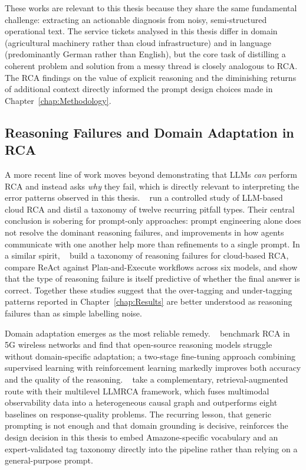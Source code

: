 These works are relevant to this thesis because they share the same fundamental
challenge: extracting an actionable diagnosis from noisy, semi-structured
operational text.  The service tickets analysed in this thesis differ in domain
(agricultural machinery rather than cloud infrastructure) and in language
(predominantly German rather than English), but the core task of distilling a
coherent problem and solution from a messy thread is closely analogous to RCA.
The RCA findings on the value of explicit reasoning and the diminishing returns
of additional context directly informed the prompt design choices made in
Chapter~\ref{chap:Methodology}.

\subsection{Reasoning Failures and Domain Adaptation in RCA}
\label{subsec:rw-rca-failures}
%
A more recent line of work moves beyond demonstrating that LLMs \emph{can}
perform RCA and instead asks \emph{why} they fail, which is directly relevant
to interpreting the error patterns observed in this thesis.
\citeauthor{kim2026why}~\cite{kim2026why} run a controlled study of LLM-based
cloud RCA and distil a taxonomy of twelve recurring pitfall types.  Their
central conclusion is sobering for prompt-only approaches: prompt engineering
alone does not resolve the dominant reasoning failures, and improvements in how
agents communicate with one another help more than refinements to a single
prompt.  In a similar spirit, \citeauthor{riddell2026stalled}~%
\cite{riddell2026stalled} build a taxonomy of reasoning failures for
cloud-based RCA, compare ReAct against Plan-and-Execute workflows across six
models, and show that the type of reasoning failure is itself predictive of
whether the final answer is correct.  Together these studies suggest that the
over-tagging and under-tagging patterns reported in Chapter~\ref{chap:Results}
are better understood as reasoning failures than as simple labelling noise.

Domain adaptation emerges as the most reliable remedy.
\citeauthor{sana2025reasoning}~\cite{sana2025reasoning} benchmark RCA in 5G
wireless networks and find that open-source reasoning models struggle without
domain-specific adaptation; a two-stage fine-tuning approach combining
supervised learning with reinforcement learning markedly improves both accuracy
and the quality of the reasoning.  \citeauthor{tan2026llmrca}~%
\cite{tan2026llmrca} take a complementary, retrieval-augmented route with their
multilevel \textsc{LLMRCA} framework, which fuses multimodal observability data
into a heterogeneous causal graph and outperforms eight baselines on
response-quality problems.  The recurring lesson, that generic prompting is not
enough and that domain grounding is decisive, reinforces the design decision in
this thesis to embed Amazone-specific vocabulary and an expert-validated tag
taxonomy directly into the pipeline rather than relying on a general-purpose
prompt.

